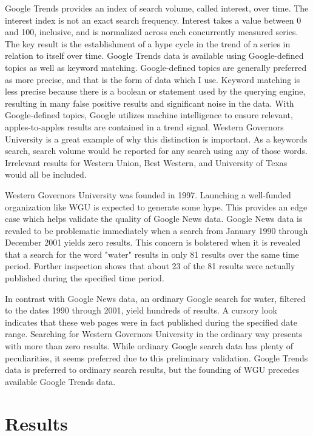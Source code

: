 \documentclass[review]{elsarticle}
\begin{document}
    Google Trends provides an index of search volume, called interest, over time.
    The interest index is not an exact search frequency.
    Interest takes a value between 0 and 100, inclusive, and is normalized across each concurrently measured series.
    The key result is the establishment of a hype cycle in the trend of a series in relation to itself over time.
    Google Trends data is available using Google-defined topics as well as keyword matching.
    Google-defined topics are generally preferred as more precise, and that is the form of data which I use.
    Keyword matching is less precise because there is a boolean or statement used by the querying engine, resulting in many false positive results and significant noise in the data.
    With Google-defined topics, Google utilizes machine intelligence to ensure relevant, apples-to-apples results are contained in a trend signal.
    Western Governors University is a great example of why this distinction is important.
    As a keywords search, search volume would be reported for any search using any of those words.
    Irrelevant results for Western Union, Best Western, and University of Texas would all be included.
    
    Western Governors University was founded in 1997.
    Launching a well-funded organization like WGU is expected to generate some hype.
    This provides an edge case which helps validate the quality of Google News data.
    Google News data is revaled to be problematic immediately when a search from January 1990 through December 2001 yields zero results.
    This concern is bolstered when it is revealed that a search for the word "water" results in only 81 results over the same time period.
    Further inspection shows that about 23 of the 81 results were actually published during the specified time period.
    
    In contrast with Google News data, an ordinary Google search for water, filtered to the dates 1990 through 2001, yield hundreds of results.
    A cursory look indicates that these web pages were in fact published during the specified date range.
    Searching for Western Governors University in the ordinary way presents with more than zero results.
    While ordinary Google search data has plenty of peculiarities, it seems preferred due to this preliminary validation.
    Google Trends data is preferred to ordinary search results, but the founding of WGU precedes available Google Trends data.

    \section{Results}
\end{document}
